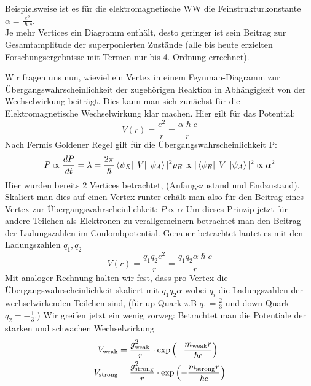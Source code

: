 \documentclass[Ex4_Zusammenfassung.tex]{subfiles}
\begin{document}
	Beispielsweise ist es für die elektromagnetische WW die Feinstrukturkonstante $\alpha = \frac{e^2}{\hslash c}$.\\
	
	Je mehr Vertices ein Diagramm enthält, desto geringer ist sein Beitrag zur Gesamtamplitude der superponierten Zustände (alle bis heute erzielten Forschungsergebnisse mit Termen nur bis 4. Ordnung errechnet).
	
	Wir fragen uns nun, wieviel ein Vertex in einem Feynman-Diagramm zur \\ Übergangswahrscheinlichkeit der zugehörigen Reaktion in Abhängigkeit von der Wechselwirkung beiträgt. Dies kann man sich zunächst für die Elektromagnetische Wechselwirkung klar machen. Hier gilt für das Potential:
	\begin{equation}
	V(r) = \frac{e^2}{r} = \frac{\alpha \hslash c}{r}
	\end{equation}
	Nach Fermis Goldener Regel gilt für die Übergangswahrscheinlichkeit P:
	\begin{equation}
	P \propto \frac{dP}{dt} = \lambda = \frac{2\pi}{\hslash} \bra{\psi_E}|V|\ket{\psi_A}|^2 \rho_E \propto  |\bra{\psi_E}|V|\ket{\psi_A}|^2 \propto \alpha^2
	\end{equation}
	Hier wurden bereits 2 Vertices betrachtet, (Anfangszustand und Endzustand). Skaliert man dies auf einen Vertex runter erhält man also für den Beitrag eines Vertex zur Übergangswahrscheinlichkeit: $ P \propto \alpha$ \newline
	Um dieses Prinzip jetzt für andere Teilchen als Elektronen zu verallgemeinern betrachtet man den Beitrag der Ladungszahlen im Coulombpotential. Genauer betrachtet lautet es mit den Ladungszahlen $q_1,q_2$
	\begin{equation}
	V(r) = \frac{q_1 q_2 e^2}{r} = \frac{q_1 q_2 \alpha \hslash c}{r} 
	\end{equation}
	Mit analoger Rechnung halten wir fest, dass pro Vertex die Übergangswahrscheinlichkeit skaliert mit $q_1 q_2 \alpha$ wobei $q_i$ die Ladungszahlen der wechselwirkenden Teilchen sind, (für up Quark z.B $q_1=\frac{2}{3}$ und down Quark $q_2= - \frac{1}{3}$.) \newline
	Wir greifen jetzt ein wenig vorweg:	Betrachtet man die Potentiale der starken und schwachen Wechselwirkung
	\begin{align}
	V_{\text{weak}} &= \frac{g_{\text{weak}}^2}{r} \cdot \exp\left( -\frac{m_{\text{weak}} r}{\hslash c}\right) \\
	V_{\text{strong}} &= \frac{g_{\text{strong}}^2}{r} \cdot \exp\left( -\frac{m_{\text{strong}} r}{\hslash c}\right)
	\end{align}
\end{document}
